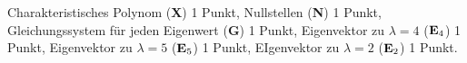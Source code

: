 \begin{bewertung}
Charakteristisches Polynom ({\bf X}) 1 Punkt,
Nullstellen ({\bf N}) 1 Punkt,
Gleichungssystem für jeden Eigenwert ({\bf G}) 1 Punkt,
Eigenvektor zu $\lambda=4$ ($\text{\bf E}_4$) 1 Punkt,
Eigenvektor zu $\lambda=5$ ($\text{\bf E}_5$) 1 Punkt,
EIgenvektor zu $\lambda=2$ ($\text{\bf E}_2$) 1 Punkt.
\end{bewertung}



